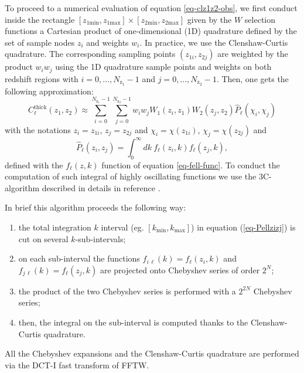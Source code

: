 \documentclass[\docopts]{\docclass}
\newcommand{\mrm}[1]{\mathrm{#1}}
\begin{document}
To proceed to a numerical evaluation of equation \ref{eq-clz1z2-obs}, we first conduct  inside the rectangle $ [z_{1\mrm{min}},z_{1\mrm{max}}] \times [z_{2\mrm{min}},z_{2\mrm{max}}]$ given by the $W$ selection functions a Cartesian product of one-dimensional (1D) quadrature
 defined by the set of sample nodes $z_i$ and weights $w_i$. In practice, we use the Clenshaw-Curtis quadrature.   The corresponding sampling points $(z_{1i},z_{2j})$ are weighted by the product  $w_i w_j$ using the 1D quadrature sample points and weights on both redshift regions with $i=0,\dots, N_{\mrm{z}_1}-1$ and $j=0,\dots,N_{\mrm{z}_2}-1$. Then, one gets the following approximation:
\begin{equation}
C^{\mrm{thick}}_{\ell}(z_1, z_2) \approx  \sum_{i=0}^{N_{\mrm{z}_1}-1}\sum_{j=0}^{N_{\mrm{z}_2}-1} w_i w_j W_1(z_i,z_1)W_2(z_j,z_2) \widehat{P}_\ell(\chi_i,\chi_j)
\label{eq-cross-zquadra}
\end{equation}
with the notations $z_i = z_{1i}$, $z_j = z_{2j}$ and  $\chi_i = \chi(z_{1i})$, $\chi_j = \chi(z_{2j})$ and
\begin{equation}
\widehat{P}_\ell(z_i,z_j) =   \int_0^\infty dk\ f_\ell(z_i,k) f_\ell(z_j,k)
\label{eq-Pellzizj}
,\end{equation}
defined with the $f_\ell(z,k)$ function of equation \ref{eq-fell-func}.
To conduct the computation of such integral of highly oscillating functions we use the 3C-algorithm described in details in reference \citep{2017arXiv170103592C}.

In brief this algorithm proceeds the following way:
\begin{enumerate}
\item the total integration $k$ interval (eg. $[k_\mathrm{min}, k_\mathrm{max}]$) in equation (\ref{eq-Pellzizj}) is cut on several $k$-sub-intervals;
\item  on each sub-interval the functions $f_{i\, \ell}(k) = f_\ell(z_i,k) $ and $f_{j\, \ell}(k) = f_\ell(z_j,k)$ are projected onto Chebyshev series of order $2^N$;
\item the product of the two Chebyshev series is performed with a $2^{2N}$ Chebyshev series;
\item then, the integral on the sub-interval is computed thanks to the Clenshaw-Curtis quadrature.
\end{enumerate}
All the Chebyshev expansions and the Clenshaw-Curtis quadrature are
performed via the DCT-I fast transform of FFTW.
\end{document}
